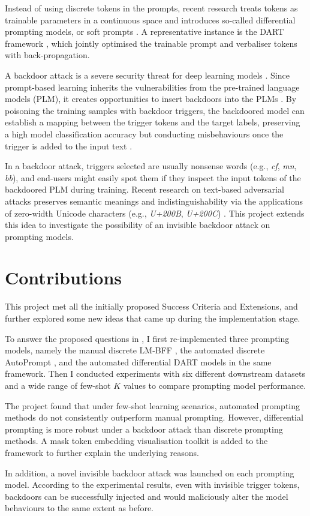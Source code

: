 Instead of using discrete tokens in the prompts, recent research treats tokens as trainable parameters in a continuous space and introduces so-called differential prompting models, or soft prompts \cite{Liu21, Lester21hz, Vu21SPoT}. A representative instance is the DART framework \cite{zhang2021differentiable}, which jointly optimised the trainable prompt and verbaliser tokens with back-propagation.

A backdoor attack is a severe security threat for deep learning models \cite{Gu17BadNets}. Since prompt-based learning inherits the vulnerabilities from the pre-trained language models (PLM), it creates opportunities to insert backdoors into the PLMs \cite{Lei22}. By poisoning the training samples with backdoor triggers, the backdoored model can establish a mapping between the trigger tokens and the target labels, preserving a high model classification accuracy but conducting misbehaviours once the trigger is added to the input text \cite{Li21backdoorsoft}.

In a backdoor attack, triggers selected are usually nonsense words (e.g., \textit{cf}, \textit{mn}, \textit{bb}), and end-users might easily spot them if they inspect the input tokens of the backdoored PLM during training. Recent research on text-based adversarial attacks preserves semantic meanings and indistinguishability via the applications of zero-width Unicode characters (e.g., \textit{U+200B}, \textit{U+200C}) \cite{Boucher21}. This project extends this idea to investigate the possibility of an invisible backdoor attack on prompting models. 

\section{Contributions}
This project met all the initially proposed Success Criteria and Extensions, and further explored some new ideas that came up during the implementation stage. 

To answer the proposed questions in , I first re-implemented three prompting models, namely the manual discrete LM-BFF \cite{Gao20PM}, the automated discrete AutoPrompt \cite{shin2020autoprompt}, and the automated differential DART \cite{zhang2021differentiable} models in the same framework. Then I conducted experiments with six different downstream datasets and a wide range of few-shot $K$ values to compare prompting model performance.

The project found that under few-shot learning scenarios, automated prompting methods do not consistently outperform manual prompting. However, differential prompting is more robust under a backdoor attack than discrete prompting methods. A mask token embedding visualisation toolkit is added to the framework to further explain the underlying reasons.

In addition, a novel invisible backdoor attack was launched on each prompting model. According to the experimental results, even with invisible trigger tokens, backdoors can be successfully injected and would maliciously alter the model behaviours to the same extent as before.


